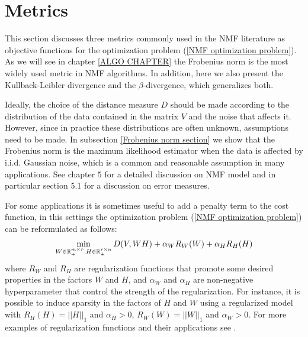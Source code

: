 \section{Metrics} \label{Metrics section}
This section discusses three metrics commonly used in the NMF literature as objective functions for the optimization problem (\ref{NMF optimization problem}).
As we will see in chapter \ref{ALGO CHAPTER} the Frobenius norm is the most widely used metric in NMF algorithms. In addition, here we also present the Kullback-Leibler divergence and the $\beta$-divergence, which generalizes both.
\par
Ideally, the choice of the distance measure $D$ should be made according to the distribution of the data contained in the matrix $V$ and the noise that affects it. However, since in practice these distributions are often unknown, assumptions need to be made.
In subsection \ref{Frobenius norm section} we show that the Frobenius norm is the maximum likelihood estimator when the data is affected by i.i.d. Gaussian noise, which is a common and reasonable assumption in many applications.
See \cite{gillis2020nonnegative} chapter $5$ for a detailed discussion on NMF model and in particular section 5.1 for a discussion on error measures.
\par
For some applications it is sometimes useful to add a penalty term to the cost function, in this settings the optimization problem (\ref{NMF optimization problem}) can be reformulated as follows:
\begin{equation}
\min_{W \in \mathbb{R}_+^{m \times r}, H \in \mathbb{R}_+^{r \times n}} D(V, WH) + \alpha_W R_W(W) + \alpha_H R_H(H)
\end{equation}
where $R_W$ and $R_H$ are regularization functions that promote some desired properties in the factors $W$ and $H$, and $\alpha_W$ and $\alpha_H$ are non-negative hyperparameter that control the strength of the regularization.
For instance, it is possible to induce sparsity in the factors of $H$ and $W$ using a regularized model with $R_H(H) = ||H||_1$ and $\alpha_H > 0$, $R_W(W) = ||W||_1$ and $\alpha_W > 0$.
For more examples of regularization functions and their applications see \cite{cichocki2009applications}.
